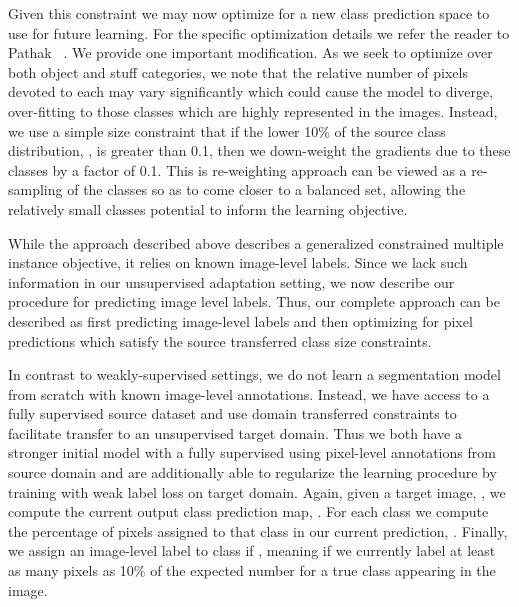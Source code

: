\documentclass[10pt,twocolumn,letterpaper]{article}
\begin{document}
Given this constraint we may now optimize for a new class prediction space to use for future learning. For the specific optimization details we refer the reader to Pathak \etal~\cite{pathak2015constrained}. We provide one important modification. As we seek to optimize over both object and stuff categories, we note that the relative number of pixels devoted to each may vary significantly which could cause the model to diverge, over-fitting to those classes which are highly represented in the images. Instead, we use a simple size constraint that if the lower 10\% of the source class distribution, , is greater than 0.1, then we down-weight the gradients due to these classes by a factor of 0.1. This is re-weighting approach can be viewed as a re-sampling of the classes so as to come closer to a balanced set, allowing the relatively small classes potential to inform the learning objective.

While the approach described above describes a generalized constrained multiple instance objective, it relies on known image-level labels. Since we lack such information in our unsupervised adaptation setting, we now describe our procedure for predicting image level labels. Thus, our complete approach can be described as first predicting image-level labels and then optimizing for pixel predictions which satisfy the source transferred class size constraints. 

In contrast to weakly-supervised settings, we do not learn a segmentation model from scratch with known image-level annotations. Instead, we have access to a fully supervised source dataset and use domain transferred constraints to facilitate transfer to an unsupervised target domain. Thus we both have a stronger initial model with a fully supervised using pixel-level annotations from source domain and are additionally able to regularize the learning procedure by training with weak label loss on target domain.
Again, given a target image, , we compute the current output class prediction map, . For each class we compute the percentage of pixels assigned to that class in our current prediction, . Finally, we assign an image-level label to class  if , meaning if we currently label at least as many pixels as 10\% of the expected number for a true class appearing in the image.
\end{document}
